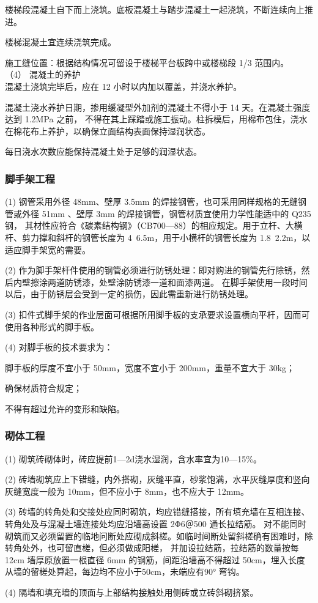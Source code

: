  楼梯段混凝土自下而上浇筑。底板混凝土与踏步混凝土一起浇筑，不断连续向上推进。

 楼梯混凝土宜连续浇筑完成。

 施工缝位置：根据结构情况可留设于楼梯平台板跨中或楼梯段 1/3 范围内。 \\

（4） 混凝土的养护\\

 混凝土浇筑完毕后，应在 12 小时以内加以覆盖，并浇水养护。

 混凝土浇水养护日期，掺用缓凝型外加剂的混凝土不得小于 14 天。在混凝土强度达到 1.2MPa 之前，
不得在其上踩踏或施工振动。柱拆模后，用棉布包住，浇水在棉花布上养护，以确保立面结构表面保持湿润状态。

 每日浇水次数应能保持混凝土处于足够的润湿状态。


\subsubsection{脚手架工程}

(1)  钢管采用外径 48mm、壁厚 3.5mm 的焊接钢管，也可采用同样规格的无缝钢管或外径 51mm 、壁厚 3mm 的焊接钢管，钢管材质宜使用力学性能适中的 Q235 钢，
其材性应符合《碳素结构钢》（CB700—88）的相应规定。用于立杆、大横杆、剪力撑和斜杆的钢管长度为 4~6.5m，用于小横杆的钢管长度为 1.8~2.2m，以适应脚手架宽的需要。

(2)  作为脚手架杆件使用的钢管必须进行防锈处理：即对购进的钢管先行除锈，然后内壁擦涂两道防锈漆，处壁涂防锈漆一道和面漆两道。
在脚手架使用一段时间以后，由于防锈层会受到一定的损伤，因此需重新进行防锈处理。

(3)  扣件式脚手架的作业层面可根据所用脚手板的支承要求设置横向平杆，因而可使用各种形式的脚手板。

(4) 对脚手板的技术要求为：

 脚手板的厚度不宜小于 50mm，宽度不宜小于 200mm，重量不宜大于 30kg；

 确保材质符合规定；

 不得有超过允许的变形和缺陷。


\subsubsection{砌体工程}

(1) 砌筑砖砌体时，砖应提前1—2d浇水湿润，含水率宜为10—15\%。

(2) 砖墙砌筑应上下错缝，内外搭砌，灰缝平直，砂浆饱满，水平灰缝厚度和竖向灰缝宽度一般为 10mm，但不应小于 8mm，也不应大于 12mm。

(3) 砖墙的转角处和交接处应同时砌筑，均应错缝搭接，所有填充墙在互相连接、转角处及与混凝土墙连接处均应沿墙高设置 2Φ6＠500 通长拉结筋。
对不能同时砌筑而又必须留置的临地问断处应砌成斜槎。如临时间断处留斜槎确有困难时，除转角处外，也可留直槎，但必须做成阳槎，
并加设拉结筋，拉结筋的数量按每 12cm 墙厚原放置一根直径 6mm 的钢筋，间距沿墙高不得超过 50cm，埋入长度从墙的留槎处算起，每边均不应小于50cm，未端应有90° 弯钩。

(4) 隔墙和填充墙的顶面与上部结构接触处用侧砖或立砖斜砌挤紧。
